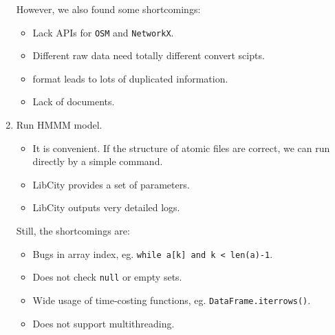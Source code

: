 \documentclass[fontset=none]{ctexart}
\theoremstyle{definition}
\theoremstyle{remark}
\begin{document}
\begin{enumerate}
        However, we also found some shortcomings:
        \begin{itemize}
          \item Lack APIs for \texttt{OSM} and \texttt{NetworkX}.
          \item Different raw data need totally different convert scipts.
          \item {} format leads to lots of duplicated information.
          \item Lack of documents.
        \end{itemize}
  \item Run HMMM model.
        \begin{itemize}
          \item It is convenient. If the structure of atomic files are correct, we can run directly by a simple command.
          \item LibCity provides a set of parameters.
          \item LibCity outputs very detailed logs.
        \end{itemize}
        Still, the shortcomings are:
        \begin{itemize}
          \item Bugs in array index, eg. \texttt{while a[k] and k < len(a)-1}.
          \item Does not check \texttt{null} or empty sets.
          \item Wide usage of time-costing functions, eg. \texttt{DataFrame.iterrows()}.
          \item Does not support multithreading.
        \end{itemize}
\end{enumerate}
\end{document}

